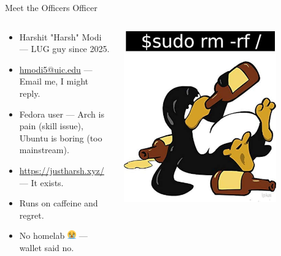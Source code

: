 \documentclass{beamer}
\begin{document}
\begin{frame}{Meet the Officers}
	{\Huge Officer}
	\begin{columns}
		\begin{column}{0.5\textwidth}
			\begin{itemize}
				\item {\Large Harshit "Harsh" Modi} — LUG guy since 2025.
				\item {\scriptsize \href{mailto:hmodi5@uic.edu}{hmodi5@uic.edu}} — Email me, I might reply.
				\item {\small Fedora user} — Arch is pain (skill issue), Ubuntu is boring (too mainstream).
				\item {\small \url{https://justharsh.xyz/}} — It exists.
				\item Runs on caffeine and regret.
				\item No homelab \includegraphics[width=1em]{cry_emoji.png} — wallet said no.
			\end{itemize}
		\end{column}
		\begin{column}{0.5\textwidth}
			\centering
			\includegraphics[width=0.8\textwidth]{drunk_tux.jpg}
		\end{column}
	\end{columns}
\end{frame}
\end{document}
